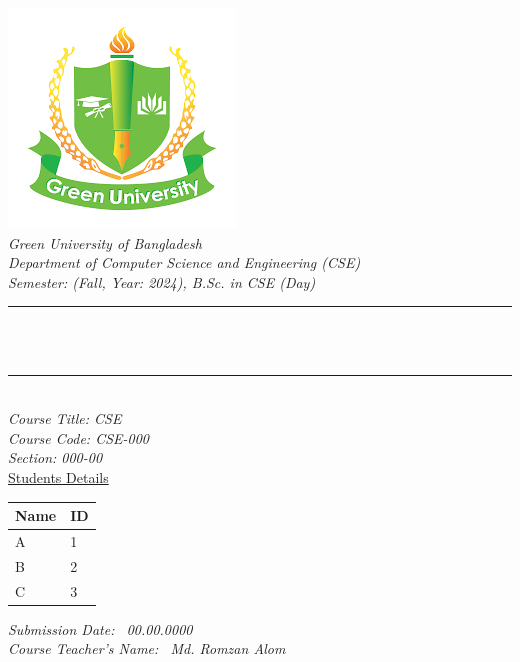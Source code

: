 \begin{titlepage}
\center 
\newcommand{\HRule}{\rule{\linewidth}{0.1mm}}
\includegraphics[scale=0.6]{Figures/GUB.png}\\[1cm] 
\center 
\textsl{\Large Green University of Bangladesh }\\[0.5cm] 
\textsl{\large Department of Computer Science and Engineering (CSE)}\\
\textsl{\large Semester: (Fall, Year: 2024), B.Sc. in CSE (Day)}\\[0.5cm] 
\makeatletter
\HRule \\[0.2cm]
{ \Large \bfseries \@title}\\[0.1cm] 
\HRule \\[1.0cm]

\textsl{\large Course Title: CSE }\\
\textsl{\large Course Code: CSE-000 }\\ 
\textsl{\large Section: 000-00 }\\[0.5cm] 

{\large \underline{Students Details}}\\[0.2cm]

\begin{table}[htb]
\centering
\begin{tabular}{ |P{7.0cm}|P{3.5cm}|}
\hline
\textbf{Name} & \textbf{ID}\\
\hline
A   & 1 \\
\hline
B & 2 \\
\hline
C & 3 \\
\hline
\end{tabular}
\end{table}
\vspace{0.5cm}


\textsl{\large Submission Date: \ 00.00.0000 }\\ 
\textsl{\large Course Teacher’s Name: \ Md. Romzan Alom }\\[0.9cm] 





\end{titlepage}
